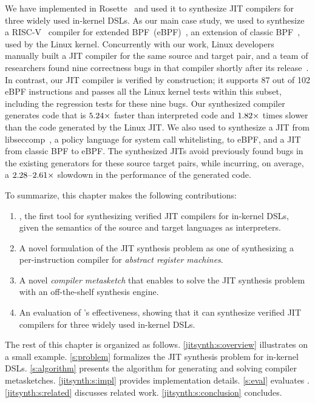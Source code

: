 We have implemented \jitsynth in Rosette~\cite{torlak:rosette} and used it to
synthesize JIT compilers for three widely used in-kernel DSLs. As our main case
study, we used \jitsynth to synthesize a RISC-V~\cite{riscv:isa} compiler for
extended BPF~(eBPF)~\cite{fleming:ebpf}, an extension of classic
BPF~\cite{mccanne:bpf}, used by the Linux kernel. Concurrently with our work,
Linux developers manually built a JIT compiler for the same source and target
pair, and a team of researchers found nine correctness bugs in that compiler
shortly after its release~\cite{nelson:serval}. In contrast, our JIT compiler is
verified by construction; it supports 87 out of 102 eBPF instructions and passes
all the Linux kernel tests within this subset, including the regression tests
for these nine bugs. Our synthesized compiler generates code that is
$5.24\times$ faster than interpreted code and
$1.82\times$ times slower than the code generated by the Linux
JIT\@. We also used  \jitsynth to synthesize a JIT from
libseccomp~\cite{edge:libseccomp}, a policy language for system call
whitelisting, to eBPF, and a JIT from classic BPF to eBPF\@. The synthesized
JITs avoid previously found bugs in the existing generators for these source
target pairs, while incurring, on average, a
$2.28$--$2.61\times$ slowdown in the performance of the
generated code.\tighten


To summarize, this chapter makes the following contributions:
\begin{enumerate}
    \item \jitsynth, the first tool for synthesizing verified JIT compilers for
    in-kernel DSLs, given the semantics of the source and target languages as
    interpreters.\tighten
    \item A novel formulation of the JIT synthesis problem as one of
    synthesizing a per-instruction compiler for \emph{abstract register
    machines}.\tighten
    \item A novel \emph{compiler metasketch} that enables \jitsynth to solve the JIT
    synthesis problem with an off-the-shelf synthesis engine.
    \item An evaluation of \jitsynth's effectiveness, showing that it can
    synthesize verified JIT compilers for three widely used in-kernel DSLs.
\end{enumerate}

The rest of this chapter is organized as follows.
%
\autoref{jitsynth:s:overview} illustrates \jitsynth on a small example.
%
\autoref{s:problem} formalizes the JIT synthesis problem for in-kernel DSLs.
%
\autoref{s:algorithm} presents the \jitsynth algorithm for generating and
solving compiler metasketches.
%
\autoref{jitsynth:s:impl} provides implementation details.
%
\autoref{s:eval} evaluates \jitsynth.
%
\autoref{jitsynth:s:related} discusses related work.
\autoref{jitsynth:s:conclusion} concludes.\tighten
